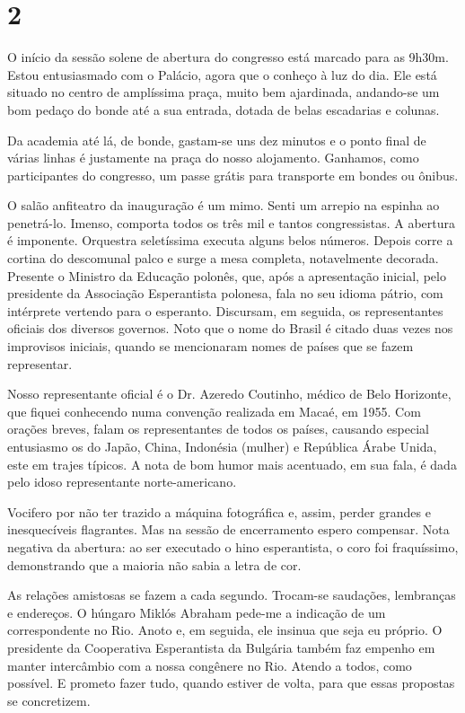 \section*{2 \adfflatleafright {}}
O início da sessão solene de abertura do congresso está marcado para as 9h30m. Estou entusiasmado com o Palácio, agora que o conheço à luz do dia. Ele está situado no centro de amplíssima praça, muito bem ajardinada, andando-se um bom pedaço do bonde até a sua entrada, dotada de belas escadarias e colunas.

Da academia até lá, de bonde, gastam-se uns dez minutos e o ponto final de várias linhas é justamente na praça do nosso alojamento. Ganhamos, como participantes do congresso, um passe grátis para transporte em bondes ou ônibus.

O salão anfiteatro da inauguração é um mimo. Senti um arrepio na espinha ao penetrá-lo. Imenso, comporta todos os três mil e tantos congressistas. A abertura é imponente. Orquestra seletíssima executa alguns belos números. Depois corre a cortina do descomunal palco e surge a mesa completa, notavelmente decorada. Presente o Ministro da Educação polonês, que, após a apresentação inicial, pelo presidente da Associação Esperantista polonesa, fala no seu idioma pátrio, com intérprete vertendo para o esperanto. Discursam, em seguida, os representantes oficiais dos diversos governos. Noto que o nome do Brasil é citado duas vezes nos improvisos iniciais, quando se mencionaram nomes de países que se fazem representar.

Nosso representante oficial é o Dr. Azeredo Coutinho, médico de Belo Horizonte, que fiquei conhecendo numa convenção realizada em Macaé, em 1955. Com orações breves, falam os representantes de todos os países, causando especial entusiasmo os do Japão, China, Indonésia (mulher) e República Árabe Unida, este em trajes típicos. A nota de bom humor mais acentuado, em sua fala, é dada pelo idoso representante norte-americano.

Vocifero por não ter trazido a máquina fotográfica e, assim, perder grandes e inesquecíveis flagrantes. Mas na sessão de encerramento espero compensar. Nota negativa da abertura: ao ser executado o hino esperantista, o coro foi fraquíssimo, demonstrando que a maioria não sabia a letra de cor.

As relações amistosas se fazem a cada segundo. Trocam-se saudações, lembranças e endereços. O húngaro Miklós Abraham pede-me a indicação de um correspondente no Rio. Anoto e, em seguida, ele insinua que seja eu próprio. O presidente da Cooperativa Esperantista da Bulgária também faz empenho em manter intercâmbio com a nossa congênere no Rio. Atendo a todos, como possível. E prometo fazer tudo, quando estiver de volta, para que essas propostas se concretizem.

